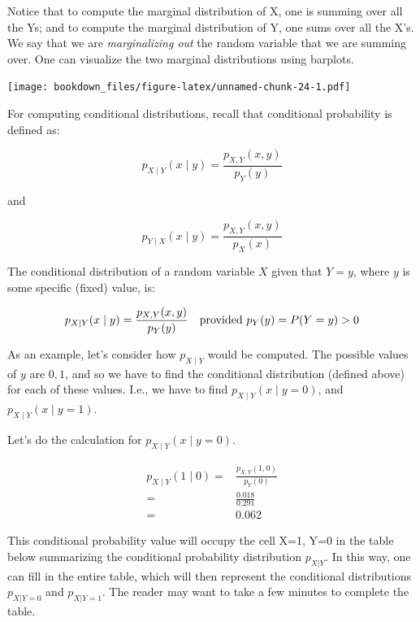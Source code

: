 \documentclass[12pt,]{krantz}
\theoremstyle{definition}
\theoremstyle{definition}
\theoremstyle{definition}
\theoremstyle{remark}
\begin{document}
Notice that to compute the marginal distribution of X, one is summing over all the Ys; and to compute the marginal distribution of Y, one sums over all the X's. We say that we are \emph{marginalizing out} the random variable that we are summing over. One can visualize the two marginal distributions using barplots.

\texttt{[image: bookdown\_files/figure-latex/unnamed-chunk-24-1.pdf]}

For computing conditional distributions, recall that conditional probability is defined as:

\begin{equation}
p_{X\mid Y}(x\mid y) = \frac{p_{X,Y}(x,y)}{p_Y(y)}  
\end{equation}

and

\begin{equation}
p_{Y\mid X}(x\mid y) = \frac{p_{X,Y}(x,y)}{p_X(x)}  
\end{equation}

The conditional distribution of a random variable \(X\) given that \(Y=y\), where \(y\) is some specific (fixed) value, is:

\begin{equation}
p_{X\mid Y} (x\mid y) = \frac{p_{X,Y}(x,y)}{p_Y(y)} \quad \hbox{provided } p_Y(y)=P(Y=y)>0
\end{equation}

As an example, let's consider how \(p_{X\mid Y}\) would be computed.
The possible values of \(y\) are \(0,1\), and so we have to find the conditional distribution (defined above) for each of these values. I.e., we have to find \(p_{X\mid Y}(x\mid y=0)\), and \(p_{X\mid Y}(x\mid y=1)\).

Let's do the calculation for \(p_{X\mid Y}(x\mid y=0)\).

\begin{equation}
\begin{split}
p_{X\mid Y} (1\mid 0) =& \frac{p_{X,Y}(1,0)}{p_Y(0)}\\
    =&  \frac{0.018}{0.291}\\
    =& 0.062
\end{split} 
\end{equation}

This conditional probability value will occupy the cell X=1, Y=0 in the table below summarizing the conditional probability distribution \(p_{X|Y}\). In this way, one can fill in the entire table, which will then represent the conditional distributions \(p_{X|Y=0}\) and \(p_{X|Y=1}\). The reader may want to take a few minutes to complete the table.
\end{document}
